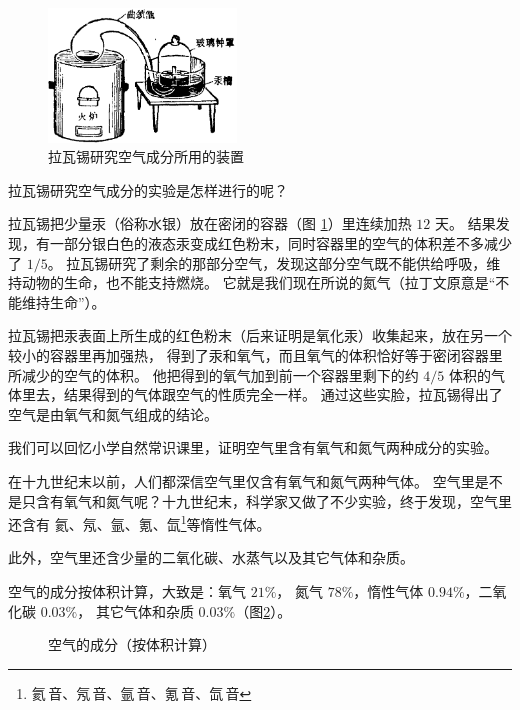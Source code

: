 \begin{yuedu}

\begin{figure}
    \centering
    \includegraphics[width=5cm]{../pic/czhx1-ch1-1}
    \caption{拉瓦锡研究空气成分所用的装置}\label{fig:1-1}
\end{figure}

    拉瓦锡研究空气成分的实验是怎样进行的呢？

    拉瓦锡把少量汞（俗称水银）放在密闭的容器（图 \ref{fig:1-1}）里连续加热 $12$ 天。
    结果发现，有一部分银白色的液态汞变成红色粉末，同时容器里的空气的体积差不多减少了 $1/5$。
    拉瓦锡研究了剩余的那部分空气，发现这部分空气既不能供给呼吸，维持动物的生命，也不能支持燃烧。
    它就是我们现在所说的氮气（拉丁文原意是“不能维持生命”）。

    拉瓦锡把汞表面上所生成的红色粉末（后来证明是氧化汞）收集起来，放在另一个较小的容器里再加强热，
    得到了汞和氧气，而且氧气的体积恰好等于密闭容器里所减少的空气的体积。
    他把得到的氧气加到前一个容器里剩下的约 $4/5$ 体积的气体里去，结果得到的气体跟空气的性质完全一样。
    通过这些实脸，拉瓦锡得出了空气是由氧气和氮气组成的结论。

\end{yuedu}


我们可以回忆小学自然常识课里，证明空气里含有氧气和氮气两种成分的实验。

在十九世纪末以前，人们都深信空气里仅含有氧气和氮气两种气体。
空气里是不是只含有氧气和氮气呢？十九世纪末，科学家又做了不少实验，终于发现，空气里还含有
氦、氖、氩、氪、氙\footnote{氦\,音、氖\,音、氩\,音、氪\,音、氙\,音}等惰性气体。

此外，空气里还含少量的二氧化碳、水蒸气以及其它气体和杂质。

空气的成分按体积计算，大致是：氧气 $21\%$， 氮气 $78\%$，惰性气体 $0.94\%$，二氧化碳 $0.03\%$，
其它气体和杂质 $0.03\%$（图\ref{fig:1-2}）。

\begin{figure}[htbp]
    \centering
    
    \caption{空气的成分（按体积计算）}\label{fig:1-2}
\end{figure}

